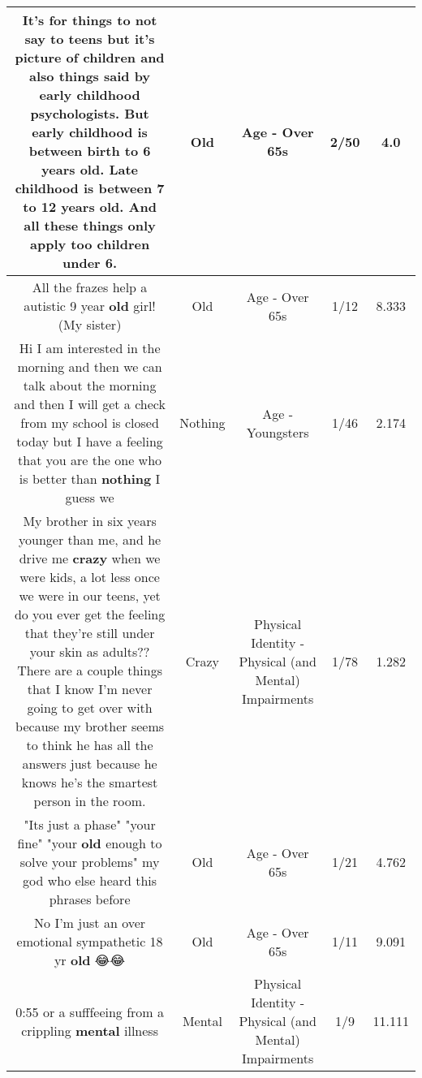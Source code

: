 \documentclass[11pt]{article}
\newlength\mylength
\begin{document}
\begin{center}
\begin{longtable}{|C{.65\mylength}|C{.30\mylength}|C{.12\mylength}|C{.12\mylength}|C{.12\mylength}|}
  \small It's for things to not say to teens but it's picture of children and also things said by early childhood psychologists. But early childhood is between birth to 6 years \textbf{old}. Late childhood is between 7 to 12 years \textbf{old}. And all these things only apply too children under 6.\normalsize   & Old & Age - Over 65s & 2/50 & 4.0 \\  \hline
  \small All the frazes  help a autistic 9 year \textbf{old} girl! (My sister)\normalsize   & Old & Age - Over 65s & 1/12 & 8.333 \\  \hline
  \small Hi I am interested in the morning and then we can talk about the morning and then I will get a check from my school is closed today but I have a feeling that you are the one who is better than \textbf{nothing} I guess we\normalsize   & Nothing & Age - Youngsters & 1/46 & 2.174 \\  \hline
  \small My brother in six years younger than me, and he drive me \textbf{crazy} when we were kids, a lot less once we were in our teens, yet do you ever get the feeling that they're still under your skin as adults?? There are a couple things that I know I'm never going to get over with because my brother seems to think he has all the answers just because he knows he's the smartest person in the room.\normalsize   & Crazy & Physical Identity - Physical (and Mental) Impairments & 1/78 & 1.282 \\  \hline
  \small "Its just a phase" "your fine" "your \textbf{old} enough to solve your problems" my god who else heard this phrases before\normalsize   & Old & Age - Over 65s & 1/21 & 4.762 \\  \hline
  \small No I'm just an over emotional sympathetic 18 yr \textbf{old} 😂😂\normalsize   & Old & Age - Over 65s & 1/11 & 9.091 \\  \hline
  \small 0:55 or a sufffeeing from a crippling \textbf{mental} illness\normalsize   & Mental & Physical Identity - Physical (and Mental) Impairments & 1/9 & 11.111 \\  \hline

\end{longtable}
\end{center}
\end{document}
